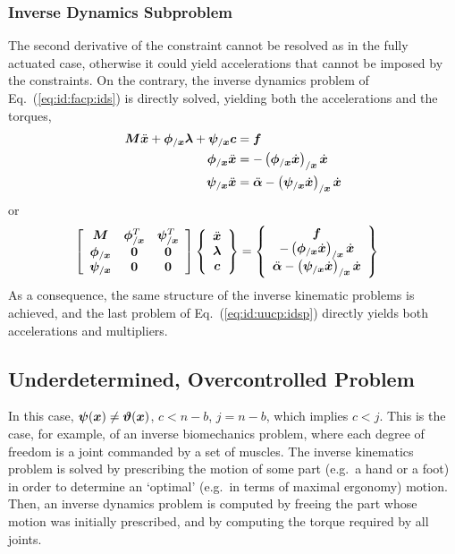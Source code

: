 \subsubsection{Inverse Dynamics Subproblem}
The second derivative of the constraint cannot be resolved
as in the fully actuated case, otherwise it could yield accelerations
that cannot be imposed by the constraints.
On the contrary, the inverse dynamics problem of Eq.~(\ref{eq:id:facp:ids})
is directly solved, yielding both the accelerations and the torques,
\begin{subequations}
\begin{align}
	\bm{M} \ddot{\bm{x}}
	+
	\bm{\phi}_{/\bm{x}} \bm{\lambda}
	+
	\bm{\psi}_{/\bm{x}} \bm{c}
	&=
	\bm{f}
	\\
	\bm{\phi}_{/\bm{x}} \ddot{\bm{x}}
	&=
	-\left( \bm{\phi}_{/\bm{x}} \dot{\bm{x}} \right)_{/\bm{x}} \dot{\bm{x}}
	\\
	\bm{\psi}_{/\bm{x}} \ddot{\bm{x}}
	&=
	\ddot{\bm{\alpha}}
	-
	\left( \bm{\psi}_{/\bm{x}} \dot{\bm{x}} \right)_{/\bm{x}} \dot{\bm{x}}
\end{align}
\end{subequations}
or
\begin{align}
	\sqbr{\matr{ccc}{
		\TT{M} & \T{\phi}_{/\T{x}}^T & \T{\psi}_{/\T{x}}^T
		\\
		\T{\phi}_{/\T{x}} & \TT{0} & \TT{0}
		\\
		\T{\psi}_{/\T{x}} & \TT{0} & \TT{0}
	}} \cubr{\cvvect{
		\ddot{\T{x}}
		\\
		\T{\lambda}
		\\
		\T{c}
	}}
	&=
	\cubr{\cvvect{
		\T{f}
		\\
		-\plbr{\T{\phi}_{/\T{x}} \dot{\T{x}}}_{/\T{x}} \dot{\T{x}}
		\\
		\ddot{\T{\alpha}}
		-
		\plbr{\T{\psi}_{/\T{x}} \dot{\T{x}}}_{/\T{x}} \dot{\T{x}}
	}}
	\label{eq:id:uucp:idsp}
\end{align}
As a consequence, the same structure of the inverse kinematic problems
is achieved, and the last problem of Eq.~(\ref{eq:id:uucp:idsp})
directly yields both accelerations and multipliers.




\subsection{Underdetermined, Overcontrolled Problem}
\label{sec:id:uop}
In this case, $\bm{\psi}(\bm{x}) \neq \bm{\vartheta}(\bm{x})$,
$c < n - b$, $j = n - b$, which implies $c < j$.
This is the case, for example, of an inverse biomechanics problem,
where each degree of freedom is a joint commanded by a set of muscles.
The inverse kinematics problem is solved by prescribing the motion
of some part (e.g.\ a hand or a foot) in order to determine an `optimal'
(e.g.\ in terms of maximal ergonomy) motion.
Then, an inverse dynamics problem is computed by freeing the part
whose motion was initially prescribed, and by computing the torque
required by all joints.

